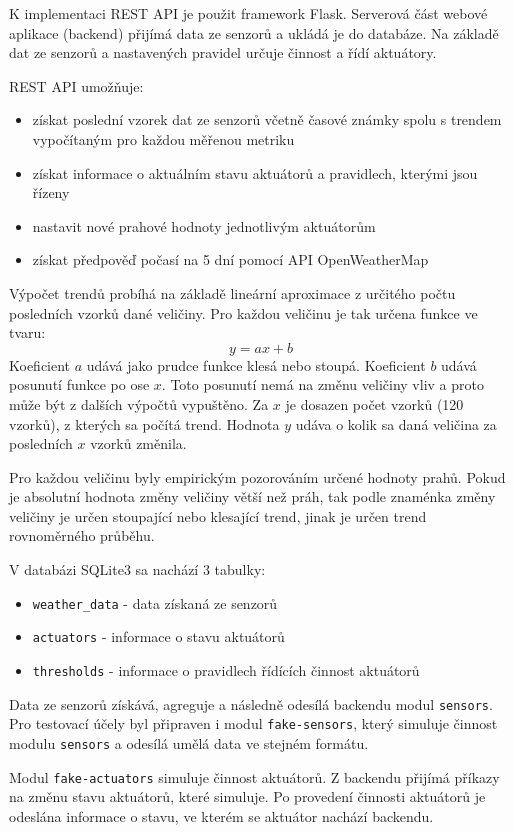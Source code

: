 \documentclass[11pt,a4paper]{article}
\begin{document}
K implementaci REST API je použit framework Flask.
Serverová část webové aplikace (backend) přijímá data ze senzorů a ukládá je do databáze.
Na základě dat ze senzorů a nastavených pravidel určuje činnost a řídí aktuátory.

REST API umožňuje:
\begin{itemize}
    \item získat poslední vzorek dat ze senzorů včetně časové známky spolu s trendem vypočítaným pro každou měřenou metriku
    \item získat informace o aktuálním stavu aktuátorů a pravidlech, kterými jsou řízeny
    \item nastavit nové prahové hodnoty jednotlivým aktuátorům
    \item získat předpověď počasí na 5 dní pomocí API OpenWeatherMap
\end{itemize}

Výpočet trendů probíhá na základě lineární aproximace z určitého počtu posledních vzorků dané veličiny.
Pro každou veličinu je tak určena funkce ve tvaru:
\[
    y = a x + b
\]
Koeficient $a$ udává jako prudce funkce klesá nebo stoupá.
Koeficient $b$ udává posunutí funkce po ose $x$. Toto posunutí nemá na změnu veličiny vliv a proto může být z dalších výpočtů vypuštěno.
Za $x$ je dosazen počet vzorků (120 vzorků), z kterých sa počítá trend.
Hodnota $y$ udáva o kolik sa daná veličina za posledních $x$ vzorků změnila.

Pro každou veličinu byly empirickým pozorováním určené hodnoty prahů.
Pokud je absolutní hodnota změny veličiny větší než práh, tak podle znaménka změny veličiny je určen stoupající nebo klesající trend, jinak je určen trend rovnoměrného průběhu.

V databázi SQLite3 sa nachází 3 tabulky:
\begin{itemize}
    \item \texttt{weather\_data} - data získaná ze senzorů
    \item \texttt{actuators} - informace o stavu aktuátorů
    \item \texttt{thresholds} - informace o pravidlech řídících činnost aktuátorů
\end{itemize}

Data ze senzorů získává, agreguje a následně odesílá backendu modul \texttt{sensors}.
Pro testovací účely byl připraven i modul \texttt{fake-sensors}, který simuluje
činnost modulu \texttt{sensors} a odesílá umělá data ve stejném formátu.

Modul \texttt{fake-actuators} simuluje činnost aktuátorů.
Z backendu přijímá příkazy na změnu stavu aktuátorů, které simuluje.
Po provedení činnosti aktuátorů je odeslána informace o stavu, ve kterém
se aktuátor nachází backendu.
\end{document}
